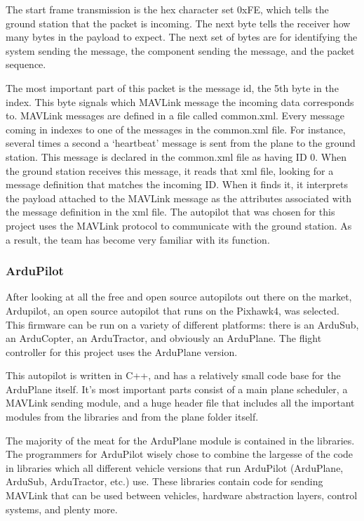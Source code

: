 \documentclass[12pt,journal,compsoc]{IEEEtran}
\begin{document}
The start frame transmission is the hex character set 0xFE, which tells the ground station that the packet is incoming. The next byte tells the receiver how many bytes in the payload to expect. The next set of bytes are for identifying the system sending the message, the component sending the message, and the packet sequence.

The most important part of this packet is the message id, the 5th byte in the index. This byte signals which MAVLink message the incoming data corresponds to. MAVLink messages are defined in a file called common.xml. Every message coming in indexes to one of the messages in the common.xml file. For instance, several times a second a `heartbeat' message is sent from the plane to the ground station. This message is declared in the common.xml file as having ID 0. When the ground station receives this message, it reads that xml file, looking for a message definition that matches the incoming ID. When it finds it, it interprets the payload attached to the MAVLink message as the attributes associated with the message definition in the xml file. 
The autopilot that was chosen for this project uses the MAVLink protocol to communicate with the ground station. As a result, the team has become very familiar with its function. 
\subsubsection{ArduPilot}
After looking at all the free and open source autopilots out there on the market, Ardupilot, an open source autopilot that runs on the Pixhawk4, was selected. This firmware can be run on a variety of different platforms: there is an ArduSub, an ArduCopter, an ArduTractor, and obviously an ArduPlane. The flight controller for this project uses the ArduPlane version. 

This autopilot is written in C++, and has a relatively small code base for the ArduPlane itself. It's most important parts consist of a main plane scheduler, a MAVLink sending module, and a huge header file that includes all the important modules from the libraries and from the plane folder itself. 

The majority of the meat for the ArduPlane module is contained in the libraries. The programmers for ArduPilot wisely chose to combine the largesse of the code in libraries which all different vehicle versions that run ArduPilot (ArduPlane, ArduSub, ArduTractor, etc.) use. These libraries contain code for sending MAVLink that can be used between vehicles, hardware abstraction layers, control systems, and plenty more. 
\end{document}
